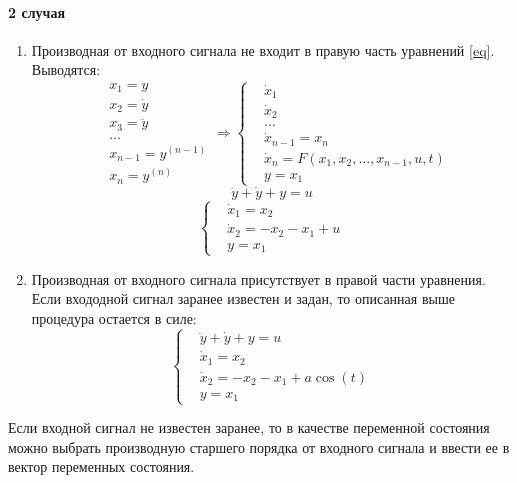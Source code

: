 \paragraph{2 случая}\mbox{}\par
\begin{enumerate}
	\item Производная от входного сигнала не входит в правую часть уравнений
		\ref{eq}.\\ Выводятся:
		\[ \begin{aligned}
			&x_1 = y \\ &x_2 = \dot y \\ &x_3 = \ddot y \\ &\dots \\ &x_{n-1} = 
			y^{(n-1)} \\ &x_n = y^{(n)}
		\end{aligned} \Longrightarrow
			\left\{ \begin{aligned}
					&\dot x_1 \\ &\dot x_2 \\ &\dots \\ &\dot x_{n-1} = x_n \\ & \dot x_n
					= F(x_1, x_2, \dots, x_{n-1}, u, t) \\ & y = x_1
		\end{aligned}\right. 
	\] 
	\null
	\[\ddot y + \dot y + y = u\]
	\[\left\{\begin{aligned}
		&\dot x_1 = x_2\\ &\dot x_2 = -x_2 - x_1 + u \\ &y = x_1
	\end {aligned}\right.\]

\item Производная от входного сигнала присутствует в правой части уравнения.
	Если входодной сигнал заранее известен и задан, то описанная выше процедура
	остается в силе:
	\[\left\{\begin{aligned}
			& \ddot y + \dot y + y = u \\ & \dot x_1 = x_2 \\ & \dot x_2 = -x_2 -x_1 +
			a \cos (t) \\ & y = x_1
		\end{aligned}\right.\]
\end{enumerate}\par
Если входной сигнал не известен заранее, то в качестве переменной состояния
можно выбрать производную старшего порядка от входного сигнала и ввести ее в
вектор переменных состояния.

